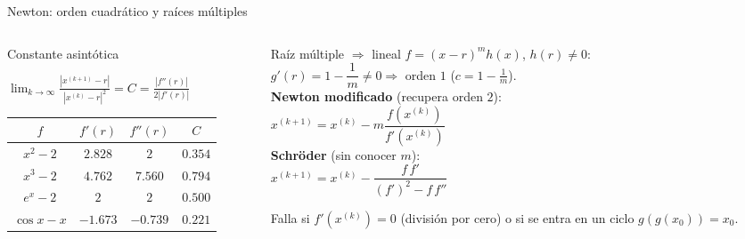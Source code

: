 \documentclass[aspectratio=169,10pt]{beamer}
\begin{document}
\begin{frame}{Newton: orden cuadrático y raíces múltiples}
\begin{columns}[T]
\begin{column}{0.50\textwidth}
\begin{cardidea}{Constante asintótica}{\faSuperscript}
{\footnotesize $\displaystyle\lim_{k\to\infty}\frac{|x^{(k+1)}-r|}{|x^{(k)}-r|^2}=C=\frac{|f''(r)|}{2|f'(r)|}$\\[1.6mm]
\centering
\renewcommand{\arraystretch}{1.2}\setlength{\tabcolsep}{4pt}
\begin{tabular}{c|ccc}
$f$ & $f'(r)$ & $f''(r)$ & $C$\\\hline
$x^2{-}2$ & $2.828$ & $2$ & $0.354$\\
$x^3{-}2$ & $4.762$ & $7.560$ & $0.794$\\
$e^x{-}2$ & $2$ & $2$ & $0.500$\\
$\cos x{-}x$ & $-1.673$ & $-0.739$ & $0.221$\\
\end{tabular}}
\end{cardidea}
\end{column}
\begin{column}{0.48\textwidth}
\begin{cardgear}{Raíz múltiple $\Rightarrow$ lineal}{\faCalculator}
{\footnotesize $f=(x-r)^m h(x)$, $h(r)\neq0$:\\[0.6mm]
$g'(r)=1-\dfrac{1}{m}\neq0\Rightarrow$ orden $1$ ($c=1-\tfrac1m$).\\[1.4mm]
\textbf{Newton modificado} (recupera orden $2$):\\[0.4mm]
$x^{(k+1)}=x^{(k)}-m\dfrac{f(x^{(k)})}{f'(x^{(k)})}$\\[1.4mm]
\textbf{Schröder} (sin conocer $m$):\\[0.4mm]
$x^{(k+1)}=x^{(k)}-\dfrac{f\,f'}{(f')^2-f\,f''}$}
\end{cardgear}
\vspace{1mm}
\begin{cardnota}[\faInfoCircle]{\footnotesize Falla si $f'(x^{(k)})=0$ (división por cero) o si se entra en un ciclo $g(g(x_0))=x_0$.}\end{cardnota}
\end{column}
\end{columns}
\end{frame}
\end{document}
